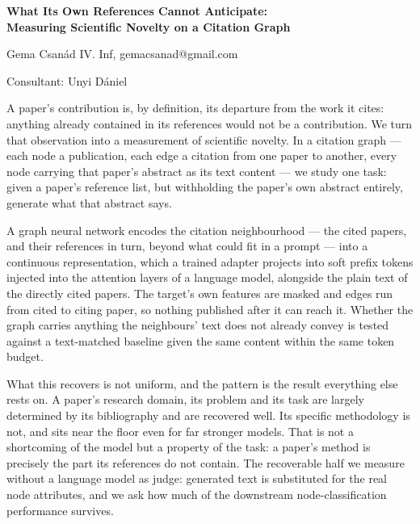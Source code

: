 \documentclass[12pt]{article}
\begin{document}
\begin{center}
    {\Large\bfseries What Its Own References Cannot Anticipate: \\
    Measuring Scientific Novelty on a Citation Graph}
\end{center}

\vspace{0.8em}

\begin{center}
    Gema Csanád IV. Inf, gemacsanad@gmail.com \\

\end{center}

\vspace{0.4em}

\begin{center}
    Consultant: Unyi Dániel
\end{center}

\vspace{1.2em}


A paper's contribution is, by definition, its departure from the work
it cites: anything already contained in its references would not be a
contribution. We turn that observation into a measurement of
scientific novelty. In a citation graph — each node a publication,
each edge a citation from one paper to another, every node carrying
that paper's abstract as its text content — we study one task: given
a paper's reference list, but withholding the paper's own abstract
entirely, generate what that abstract says.

A graph neural network encodes the citation neighbourhood — the cited
papers, and their references in turn, beyond what could fit in a
prompt — into a continuous representation, which a trained adapter
projects into soft prefix tokens injected into the attention layers
of a language model, alongside the plain text of the directly cited
papers. The target's own features are masked and edges run from cited
to citing paper, so nothing published after it can reach it. Whether
the graph carries anything the neighbours' text does not already
convey is tested against a text-matched baseline given the same
content within the same token budget.

What this recovers is not uniform, and the pattern is the result
everything else rests on. A paper's research domain, its problem and
its task are largely determined by its bibliography and are recovered
well. Its specific methodology is not, and sits near the floor even
for far stronger models. That is not a shortcoming of the model but a
property of the task: a paper's method is precisely the part its
references do not contain. The recoverable half we measure without a
language model as judge: generated text is substituted for the real
node attributes, and we ask how much of the downstream
node-classification performance survives.
\end{document}
